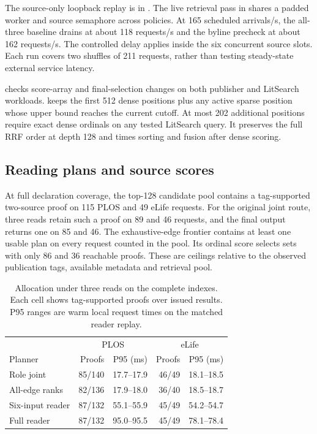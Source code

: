 The source-only loopback replay is in . The live retrieval pass in  shares a padded worker and source semaphore across policies. At 165 scheduled arrivals/s, the all-three baseline drains at about 118 requests/s and the byline precheck at about 162 requests/s. The controlled delay applies inside the six concurrent source slots. Each run covers two shuffles of 211 requests, rather than testing steady-state external service latency.

 checks score-array and final-selection changes on both publisher and LitSearch workloads.  keeps the first 512 dense positions plus any active sparse position whose upper bound reaches the current cutoff. At most 202 additional positions require exact dense ordinals on any tested LitSearch query. It preserves the full RRF order at depth 128 and times sorting and fusion after dense scoring.

\subsection{Reading plans and source scores}
At full declaration coverage, the top-128 candidate pool contains a tag-supported two-source proof on 115 PLOS and 49 eLife requests. For the original joint route, three reads retain such a proof on 89 and 46 requests, and the final output returns one on 85 and 46. The exhaustive-edge frontier contains at least one usable plan on every request counted in the pool. Its ordinal score selects sets with only 86 and 36 reachable proofs. These are ceilings relative to the observed publication tags, available metadata and retrieval pool.

\begin{table}[t]
\caption{Allocation under three reads on the complete indexes. Each cell shows tag-supported proofs over issued results. P95 ranges are warm local request times on the matched reader replay.}
\label{tab:plan-supp}
\centering\small
\begin{tabular}{@{}lrrrr@{}}\toprule
 & \multicolumn{2}{c}{PLOS} & \multicolumn{2}{c}{eLife} \\
Planner & Proofs & P95 (ms) & Proofs & P95 (ms) \\\midrule
Role joint & 85/140 & 17.7--17.9 & 46/49 & 18.1--18.5 \\
All-edge ranks & 82/136 & 17.9--18.0 & 36/40 & 18.5--18.7 \\
Six-input reader & 87/132 & 55.1--55.9 & 45/49 & 54.2--54.7 \\
Full reader & 87/132 & 95.0--95.5 & 45/49 & 78.1--78.4 \\
\bottomrule\end{tabular}
\end{table}

